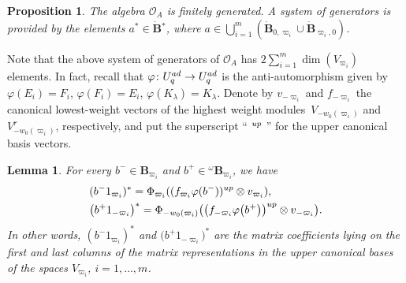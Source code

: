 \documentclass[11pt]{article}
\numberwithin{equation}{section}
\numberwithin{equation}{section}
\newtheorem{lem}[teo]{Lemma}
\newtheorem{prop}[teo]{Proposition}
\theoremstyle{definition}
\newcommand{\Oo}{{\mathcal O}}
\newcommand{\ra}{\rightarrow}
\begin{document}
\begin{prop}\label{genOA} The algebra $\Oo_A$ is finitely generated. A system of generators is provided by the elements $a^*\in \dot {\mathbf{B}} {}^*$, where $a \in \bigcup_{i=1}^m (\dot{\mathbf{B}}_{0,\varpi_i}\cup \dot{\mathbf{B}}_{\varpi_i,0})$.\end{prop}
Note that the above system of generators of $\Oo_A$ has
$2 \sum_{i=1}^m \dim(V_{\varpi_i})$
 elements. In fact, recall that $\varphi\colon U_q^{\rm ad} \ra U_q^{\rm ad}$ is the anti-automorphism given by $\varphi(E_i) = F_i$, $\varphi(F_i) = E_i$, $\varphi(K_\lambda) = K_{\lambda}$. Denote by $v_{-\varpi_i}$ and $f_{-\varpi_i}$ the canonical lowest-weight vectors of the highest weight modules~${V_{-w_0(\varpi_i)}}$ and $V_{-w_0(\varpi_i)}^r$, respectively, and put the superscript `` ${}^{\rm up}$ '' for the upper canonical basis vectors.
\begin{lem} For every $b^- \in \mathbf{B}_{\varpi_i}$ and $b^+\in {}^\omega \mathbf{B}_{\varpi_i}$, we have
\begin{align}
 &(b^-1_{\varpi_i})^* = \Phi_{\varpi_i}((f_{\varpi_i} \varphi(b^-))^{\rm up} \otimes v_{\varpi_i}), \label{formgenOA1} \\
 &\big(b^+1_{-\varpi_i}\big)^* = \Phi_{-w_0(\varpi_i)}\big(\big(f_{-\varpi_i} \varphi\big(b^+\big)\big)^{\rm up} \otimes v_{-\varpi_i}\big). \label{formgenOA2} \end{align}
In other words, $(b^-1_{\varpi_i})^*$ and $\big(b^+1_{-\varpi_i}\big)^*$ are the matrix coefficients lying on the first and last columns of the matrix representations in the upper canonical bases of the spaces $V_{\varpi_i}$, ${i=1,\dots, m}$.
\end{lem}
\end{document}
